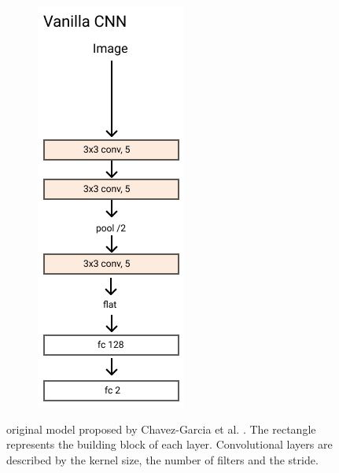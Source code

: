 \documentclass[../document.tex]{subfiles}
\begin{document}
\begin{figure}[htbp]
\begin{subfigure}[b]{0.25\linewidth}
        \includegraphics[width=\linewidth]{../img/3/models/transparent-omar.png}
    \end{subfigure}
    \caption{original model proposed by Chavez-Garcia et al. \cite{omar2018traversability}. The rectangle represents the building block of each layer. Convolutional layers are described by the kernel size, the number of filters and the stride.}
    \label{fig : omar}
\end{figure}
\end{document}
